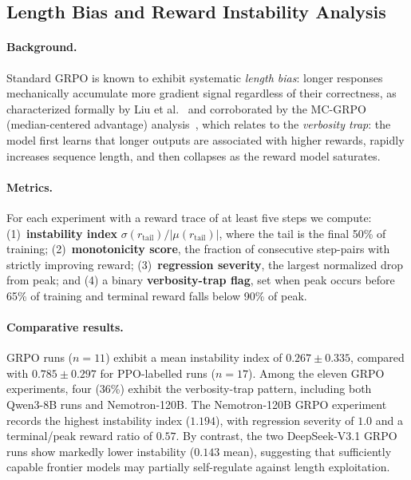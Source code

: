 \documentclass{article}
\begin{document}
\subsection{Length Bias and Reward Instability Analysis}
\label{sec:length_bias}

\paragraph{Background.}
Standard GRPO is known to exhibit systematic \emph{length bias}: longer responses
mechanically accumulate more gradient signal regardless of their correctness,
as characterized formally by Liu et al.~\cite{tong2025drgrpo} and corroborated
by the MC-GRPO (median-centered advantage) analysis~\cite{mcgrpo2025}, which
relates to the \emph{verbosity trap}: the model first learns that longer outputs are associated
with higher rewards, rapidly increases sequence length, and then collapses as
the reward model saturates.

\paragraph{Metrics.}
For each experiment with a reward trace of at least five steps we compute:
(1)~\textbf{instability index} $\sigma(r_{\text{tail}}) / |\mu(r_{\text{tail}})|$,
where the tail is the final 50\% of training;
(2)~\textbf{monotonicity score}, the fraction of consecutive step-pairs with
strictly improving reward;
(3)~\textbf{regression severity}, the largest normalized drop from peak;
and (4) a binary \textbf{verbosity-trap flag}, set when peak occurs before 65\%
of training and terminal reward falls below 90\% of peak.

\paragraph{Comparative results.}
GRPO runs ($n = 11$) exhibit a mean instability index of $0.267 \pm 0.335$,
compared with $0.785 \pm 0.297$ for PPO-labelled runs ($n = 17$). Among the
eleven GRPO experiments, four (36\%) exhibit the verbosity-trap pattern,
including both Qwen3-8B runs and Nemotron-120B. The Nemotron-120B GRPO
experiment records the highest instability index ($1.194$), with regression
severity of $1.0$ and a terminal/peak reward ratio of $0.57$. By contrast,
the two DeepSeek-V3.1 GRPO runs show markedly lower instability ($0.143$
mean), suggesting that sufficiently capable frontier models may partially
self-regulate against length exploitation.
\end{document}
